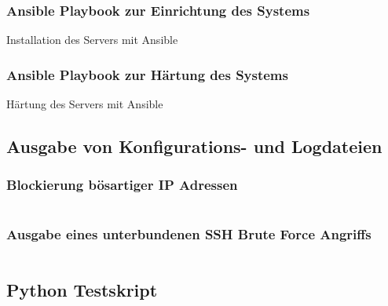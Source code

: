 \subsubsection{Ansible Playbook zur Einrichtung des Systems}
\begin{longlisting}
    \caption{Installation des Servers mit Ansible}
    \label{listing:ansible_playbook}
\end{longlisting}

\subsubsection{Ansible Playbook zur Härtung des Systems}
\begin{longlisting}
    \caption{Härtung des Servers mit Ansible}
    \label{listing:hardening}
\end{longlisting}

\subsection{Ausgabe von Konfigurations- und Logdateien}

\subsubsection{Blockierung bösartiger IP Adressen}\label{kap:fw_abuse}

\inputminted[fontfamily=tt,
linenos=true,
numberblanklines=true,
numbersep=5pt,
gobble=0,
frame=leftline,
framerule=0.4pt,
framesep=2mm,
funcnamehighlighting=true,
tabsize=4,
obeytabs=false,
mathescape=false
samepage=false, %
showspaces=false,
showtabs =false,
texcl=false,
breaklines=true]{docker}{code/shell/fw_abuse.sh}

\subsubsection{Ausgabe eines unterbundenen SSH Brute Force Angriffs}
\inputminted[breaklines=true,firstline=34, lastline=42]{text}{code/output/sshguard.txt}\label{listing:sshguard_log}

\subsection{Python Testskript}\label{kap:testskript_python}

